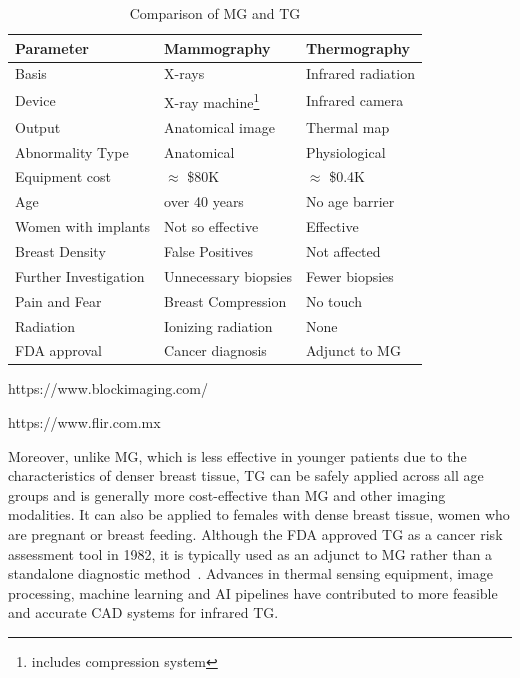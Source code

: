 \documentclass[runningheads]{llncs}
\begin{document}
\begin{table}[!htbp]
\begin{threeparttable}
  \centering
  \caption{Comparison of \ac{MG} and \ac{TG}}
  \label{tab:mg-tg-compare}
  \scriptsize
  \begin{tabularx}{.9\textwidth}{XXX}
    \hline
    \textbf{Parameter} & \textbf{Mammography} & \textbf{Thermography} \\
    \hline
    Basis & X-rays & Infrared radiation \\
    Device & X-ray machine\footnote{includes compression system} & Infrared camera \\
    Output & Anatomical image & Thermal map \\
    Abnormality Type & Anatomical & Physiological \\
    Equipment cost & $\approx$
                     \$80K\tnote{a} & $\approx$ \$0.4K\tnote{b} \\
    Age & over 40 years & No age barrier \\
    Women with implants & Not so effective & Effective \\
    Breast Density & False Positives & Not affected \\
    Further Investigation & Unnecessary biopsies & Fewer biopsies\\
    Pain and Fear & Breast Compression & No touch\\
    Radiation & Ionizing radiation & None\\
    \ac{FDA} approval & Cancer diagnosis & Adjunct to MG\\
    \hline

  \end{tabularx}
  \begin{tablenotes}
  \item[a] https://www.blockimaging.com/
  \item[b] https://www.flir.com.mx

  \end{tablenotes}
\end{threeparttable}
\end{table}

Moreover, unlike \ac{MG}, which is less effective in younger patients
due to the characteristics of denser breast tissue, \ac{TG} can be
safely applied across all age groups and is generally more
cost-effective than \ac{MG} and other imaging modalities. It can also
be applied to females with dense breast tissue, women who are pregnant
or breast feeding. Although the \ac{FDA} approved \ac{TG} as a cancer
risk assessment tool in 1982, it is typically used as an adjunct to
\ac{MG} rather than a standalone diagnostic
method~\cite{Kennedy2009,Ryan2025}. Advances in thermal sensing
equipment, image processing, machine learning and \ac{AI} pipelines
have contributed to more feasible and accurate \ac{CAD} systems for
infrared \ac{TG}.
\end{document}
